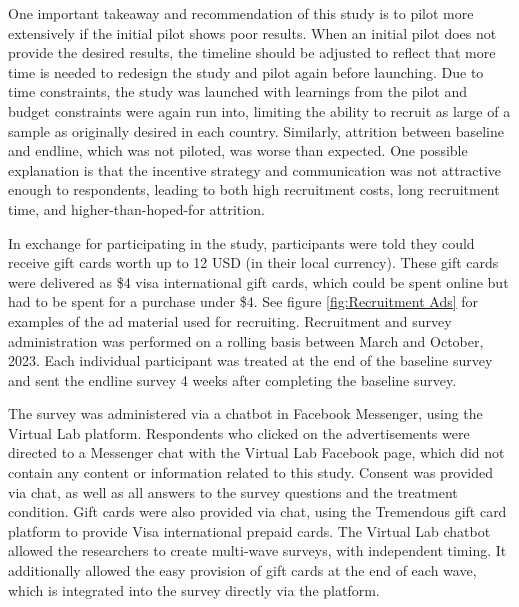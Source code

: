 \documentclass{article}
\begin{document}
One important takeaway and recommendation of this study is to pilot more extensively if the initial pilot shows poor results. When an initial pilot does not provide the desired results, the timeline should be adjusted to reflect that more time is needed to redesign the study and pilot again before launching. Due to time constraints, the study was launched with learnings from the pilot and budget constraints were again run into, limiting the ability to recruit as large of a sample as originally desired in each country. Similarly, attrition between baseline and endline, which was not piloted, was worse than expected. One possible explanation is that the incentive strategy and communication was not attractive enough to respondents, leading to both high recruitment costs, long recruitment time, and higher-than-hoped-for attrition.

In exchange for participating in the study, participants were told they could receive gift cards worth up to 12 USD (in their local currency). These gift cards were delivered as \$4 visa international gift cards, which could be spent online but had to be spent for a purchase under \$4. See figure \ref{fig:Recruitment Ads} for examples of the ad material used for recruiting. Recruitment and survey administration was performed on a rolling basis between March and October, 2023. Each individual participant was treated at the end of the baseline survey and sent the endline survey 4 weeks after completing the baseline survey.

The survey was administered via a chatbot in Facebook Messenger, using the Virtual Lab platform. Respondents who clicked on the advertisements were directed to a Messenger chat with the Virtual Lab Facebook page, which did not contain any content or information related to this study. Consent was provided via chat, as well as all answers to the survey questions and the treatment condition. Gift cards were also provided via chat, using the Tremendous gift card platform to provide Visa international prepaid cards. The Virtual Lab chatbot allowed the researchers to create multi-wave surveys, with independent timing. It additionally allowed the easy provision of gift cards at the end of each wave, which is integrated into the survey directly via the platform.

\end{document}
